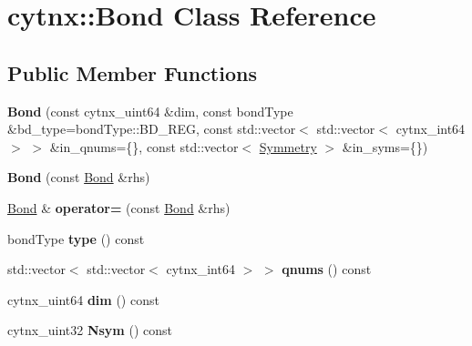 \hypertarget{classcytnx_1_1Bond}{}\section{cytnx\+:\+:Bond Class Reference}
\label{classcytnx_1_1Bond}
\subsection*{Public Member Functions}
\begin{DoxyCompactItemize}
\item 
\mbox{\label{classcytnx_1_1Bond_a80ee6b9a0dd288e74d885f6f288b5a0c}} 
{\bfseries Bond} (const cytnx\+\_\+uint64 \&dim, const bond\+Type \&bd\+\_\+type=bond\+Type\+::\+B\+D\+\_\+\+R\+EG, const std\+::vector$<$ std\+::vector$<$ cytnx\+\_\+int64 $>$ $>$ \&in\+\_\+qnums=\{\}, const std\+::vector$<$ \hyperlink{classcytnx_1_1Symmetry}{Symmetry} $>$ \&in\+\_\+syms=\{\})
\item 
\mbox{\label{classcytnx_1_1Bond_a9d7f2edc5cc41786f75021844fea43b4}} 
{\bfseries Bond} (const \hyperlink{classcytnx_1_1Bond}{Bond} \&rhs)
\item 
\mbox{\label{classcytnx_1_1Bond_a7cf807da8c8069946f59eba9348583da}} 
\hyperlink{classcytnx_1_1Bond}{Bond} \& {\bfseries operator=} (const \hyperlink{classcytnx_1_1Bond}{Bond} \&rhs)
\item 
\mbox{\label{classcytnx_1_1Bond_a8517743cec9589ed551114ea7e55fbb1}} 
bond\+Type {\bfseries type} () const
\item 
\mbox{\label{classcytnx_1_1Bond_ac33a7bc780a4c7afba2b6d2d571bf23e}} 
std\+::vector$<$ std\+::vector$<$ cytnx\+\_\+int64 $>$ $>$ {\bfseries qnums} () const
\item 
\mbox{\label{classcytnx_1_1Bond_aa072647e03a4c797479445bd41b9eacf}} 
cytnx\+\_\+uint64 {\bfseries dim} () const
\item 
\mbox{\label{classcytnx_1_1Bond_acd46a218add6a88c1cc9035b06adb7b6}} 
cytnx\+\_\+uint32 {\bfseries Nsym} () const
\item 
\mbox{\label{classcytnx_1_1Bond_ad0adf7b134654f0390e98695ba4d416e}} 

\end{DoxyCompactItemize}
